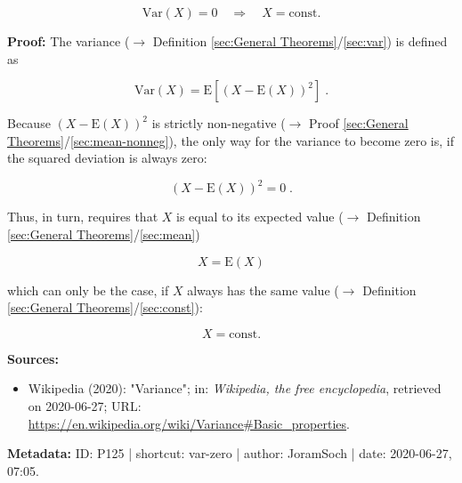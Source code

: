 \documentclass[a4paper,12pt,twoside]{book}
\begin{document}
\begin{equation} \label{eq:var-zero-var-zero}
\mathrm{Var}(X) = 0 \quad \Rightarrow \quad X = \text{const.}
\end{equation}


\vspace{1em}
\textbf{Proof:} The variance ($\rightarrow$ Definition \ref{sec:General Theorems}/\ref{sec:var}) is defined as

\begin{equation} \label{eq:var-zero-var}
\mathrm{Var}(X) = \mathrm{E}\left[ (X-\mathrm{E}(X))^2 \right] \; .
\end{equation}

Because $(X-\mathrm{E}(X))^2$ is strictly non-negative ($\rightarrow$ Proof \ref{sec:General Theorems}/\ref{sec:mean-nonneg}), the only way for the variance to become zero is, if the squared deviation is always zero:

\begin{equation} \label{eq:var-zero-sqr-dev-zero}
(X-\mathrm{E}(X))^2 = 0 \; .
\end{equation}

Thus, in turn, requires that $X$ is equal to its expected value ($\rightarrow$ Definition \ref{sec:General Theorems}/\ref{sec:mean})

\begin{equation} \label{eq:var-zero-X-eq-E-X}
X = \mathrm{E}(X)
\end{equation}

which can only be the case, if $X$ always has the same value ($\rightarrow$ Definition \ref{sec:General Theorems}/\ref{sec:const}):

\begin{equation} \label{eq:var-zero-X-const}
X = \text{const.}
\end{equation}



\vspace{1em}
\textbf{Sources:}
\begin{itemize}
\item Wikipedia (2020): "Variance"; in: \textit{Wikipedia, the free encyclopedia}, retrieved on 2020-06-27; URL: \url{https://en.wikipedia.org/wiki/Variance#Basic_properties}.
\end{itemize}


\vspace{1em}
\textbf{Metadata:} ID: P125 | shortcut: var-zero | author: JoramSoch | date: 2020-06-27, 07:05.
\vspace{1em}
\end{document}

